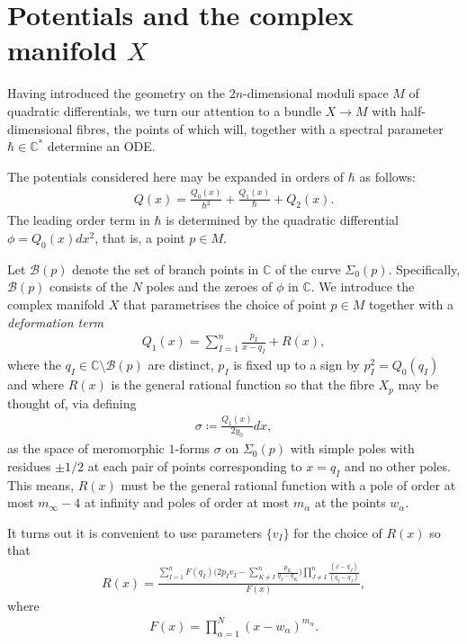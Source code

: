 \documentclass[a4paper,12pt,reqno]{amsart}
\numberwithin{equation}{section}
\numberwithin{counter2}{section}
\begin{document}
\section{Potentials and the complex manifold $X$}\label{potential_setup}
Having introduced the geometry on the $2n$-dimensional moduli space $M$ of quadratic differentials,  we turn our attention to a bundle $X \to M$ with half-dimensional fibres,  the points of which will,  together with a spectral parameter $\hbar \in \mathbb{C}^*$ determine an ODE.  \par 
The potentials considered here may be expanded in orders of $\hbar$ as follows: 
\begin{align}\label{hbar_expansion_potential}
Q(x) = \frac{Q_0(x)}{\hbar^2}+\frac{Q_1(x)}{\hbar}+Q_2(x). 
\end{align}
The leading order term in $\hbar$ is determined by the quadratic differential $\phi = Q_0(x)dx^2$,  that is,  a point $p \in M$.  \par 
Let $\mathcal{B}(p)$ denote the set of branch points in $\mathbb{C}$ of the curve $\Sigma_0(p)$.  Specifically,  $\mathcal{B}(p)$ consists of the $N$ poles and the zeroes of $\phi$ in $\mathbb{C}$.   
We introduce the complex manifold $X$ that parametrises the choice of point $p \in M$ together with a \textit{deformation term}
\begin{align}
Q_1(x) = \sum_{I=1}^{n} \frac{p_I}{x-q_I} + R(x),  
\end{align}
where the 
$q_{I} \in \mathbb{C} \setminus \mathcal{B}(p)$ are distinct,  $p_I$ is fixed up to a sign by $p_I^2 = Q_0(q_I)$ and where $R(x)$ is the general rational function so that the fibre $X_p$ may be thought of,  via defining 
\begin{align}\label{sigma}
\sigma \coloneqq \frac{Q_1(x)}{2y_0}dx,  
\end{align}
as the space of meromorphic $1$-forms $\sigma$ on $\Sigma_0(p)$ with simple poles with residues $\pm 1/2$ at each pair of points corresponding to $x = q_I$ and no other poles.  This means,  $R(x)$ must be the general rational function with a pole of order at most $m_\infty-4$ at infinity and poles of order at most $m_\alpha$ at the points $w_\alpha$.  

It turns out it is convenient to use parameters $\{v_I\}$ for the choice of $R(x)$ so that 
\begin{align}\label{Rfrac}
R(x) = \frac{\displaystyle{\sum_{I=1}^{n}F(q_I)\Big(2p_Iv_I - \sum_{K \ne I}^{n}\frac{p_K}{q_I-q_K}\Big)\prod_{J \ne I}^n \frac{(x-q_J)}{(q_I-q_J)}}}{F(x)},
\end{align}
where 
\begin{align}
F(x) = \prod_{\alpha=1}^{N}(x-w_\alpha)^{m_\alpha}.  
\end{align}
\end{document}
